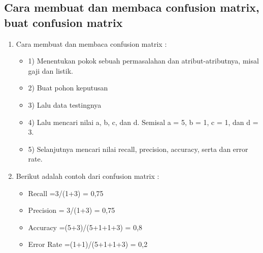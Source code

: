 \subsection{ Cara membuat dan membaca confusion matrix, buat confusion matrix }
\begin{enumerate}
\item Cara membuat dan membaca confusion matrix :
\begin{itemize}
\item 1)	Menentukan pokok sebuah permasalahan dan atribut-atributnya, misal gaji dan listik.
\item 2)	Buat pohon keputusan
\item 3)	Lalu data testingnya
\item 4)	Lalu mencari nilai a, b, c, dan d. Semisal a = 5, b = 1, c = 1, dan d = 3.
\item 5)	Selanjutnya mencari nilai recall, precision, accuracy, serta dan error rate.
\end{itemize}
\item Berikut adalah contoh dari confusion matrix :
\begin{itemize}
\item Recall =3/(1+3) = 0,75
\item Precision = 3/(1+3) = 0,75
\item Accuracy =(5+3)/(5+1+1+3) = 0,8
\item Error Rate =(1+1)/(5+1+1+3) = 0,2
\end{itemize}
\end{enumerate}

